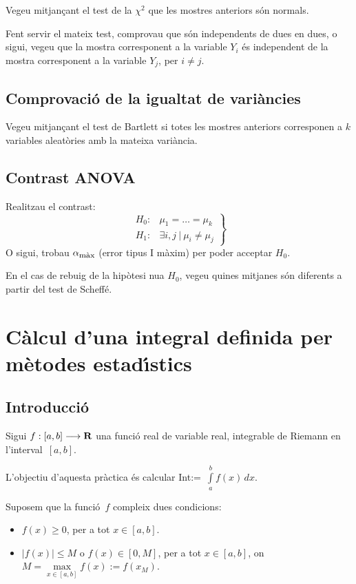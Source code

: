 Vegeu mitjan\c{c}ant el test de la $\chi^2$ que les mostres anteriors
s\'on normals.

Fent servir el mateix test, comprovau que s\'on independents de
 dues en dues, o
sigui, vegeu que la mostra corresponent a la variable $Y_i$ \'es
independent de la mostra corresponent a la variable $Y_j$, per $i\not = j$.

\subsection{Comprovaci\'o de la igualtat de vari\`ancies}

Vegeu mitjan\c{c}ant el test de Bartlett si totes 
les mostres anteriors corresponen a $k$ variables 
aleat\`ories amb la mateixa 
vari\`ancia.


\subsection{Contrast ANOVA}

Realitzau el contrast:
\[
\left.
\begin{array}{rl}
H_0: & \mu_1 =\ldots =\mu_k \\
H_1: & \exists i,j\ |\ \mu_i\not =\mu_j
\end{array}
\right\}
\]
O sigui, trobau $\alpha_{\mbox{\footnotesize m\`ax}}$ (error tipus I
m\`axim) per poder acceptar $H_0$.

En el cas de rebuig de la hip\`otesi nu{\lgem}a $H_0$, vegeu quines mitjanes
s\'on diferents a partir del test de Scheff\'e.


\section{C\`alcul d'una integral definida 
per m\`etodes estad\'{\i}stics}

\subsection{Introducci\'o}

Sigui 
\(
f:[a,b] \longrightarrow  {\bf R} 
\)
una funci\'o real de variable real, integrable de Riemann
 en l'interval~$[a,b]$.

L'objectiu d'aquesta pr\`actica \'es calcular 
\mbox{Int:= $\int\limits_a^b f(x)\, dx$.}

Suposem que la funci\'o~$f$ compleix dues condicions:
\begin{itemize}
\item $f(x)\geq 0$, per a tot $x\in [a,b]$.

\item $|f(x)|\leq M$ o $f(x)\in [0,M]$, per a tot $x\in [a,b]$, on
\mbox{$M=\max\limits_{x\in [a,b]} f(x):= f(x_M)$.}
\end{itemize}

